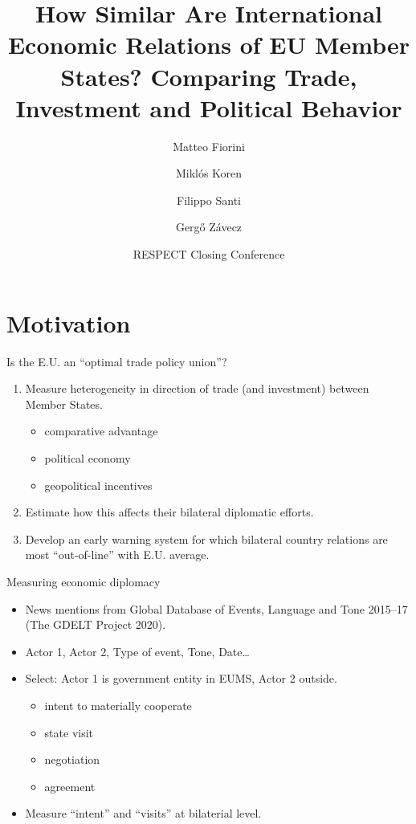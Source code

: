 \documentclass[
  ignorenonframetext,
  aspectratio=16,
]{beamer}
\title{How Similar Are International Economic Relations of EU Member
States? Comparing Trade, Investment and Political Behavior}
\author{Matteo Fiorini \and Miklós Koren \and Filippo Santi \and Gergő
Závecz}
\date{RESPECT Closing Conference}
\providecommand{\tightlist}{%
  \setlength{\itemsep}{0pt}\setlength{\parskip}{0pt}}
\begin{document}
\frame{\titlepage}

\hypertarget{motivation}{%
\section{Motivation}\label{motivation}}

\begin{frame}{Is the E.U. an ``optimal trade policy union''?}
\protect\hypertarget{is-the-e.u.-an-optimal-trade-policy-union}{}
\begin{enumerate}
\tightlist
\item
  Measure heterogeneity in direction of trade (and investment) between
  Member States.

  \begin{itemize}
  \tightlist
  \item
    comparative advantage
  \item
    political economy
  \item
    geopolitical incentives
  \end{itemize}
\item
  Estimate how this affects their bilateral diplomatic efforts.
\item
  Develop an early warning system for which bilateral country relations
  are most ``out-of-line'' with E.U. average.
\end{enumerate}
\end{frame}

\begin{frame}{Measuring economic diplomacy}
\protect\hypertarget{measuring-economic-diplomacy}{}
\begin{itemize}
\tightlist
\item
  News mentions from Global Database of Events, Language and Tone
  2015--17 (The GDELT Project 2020).
\item
  Actor 1, Actor 2, Type of event, Tone, Date\ldots{}
\item
  Select: Actor 1 is government entity in EUMS, Actor 2 outside.

  \begin{itemize}
  \tightlist
  \item
    intent to materially cooperate
  \item
    state visit
  \item
    negotiation
  \item
    agreement
  \end{itemize}
\item
  Measure ``intent'' and ``visits'' at bilaterial level.
\end{itemize}
\end{frame}
\end{document}
